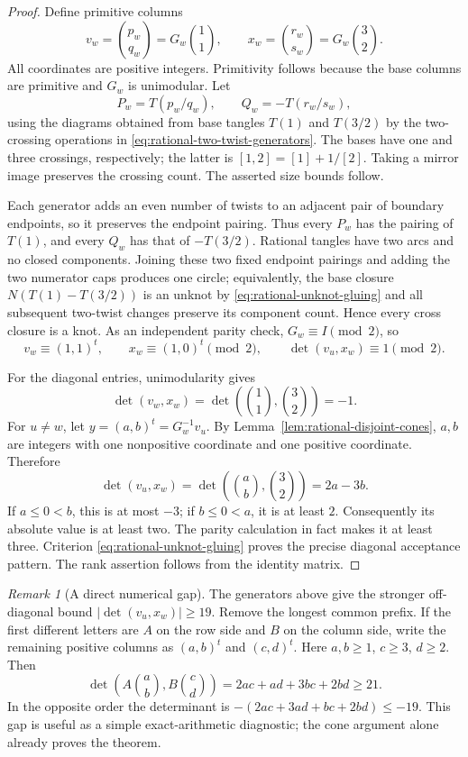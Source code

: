 \documentclass[11pt,a4paper]{article}
\theoremstyle{definition}
\theoremstyle{remark}
\newtheorem{remark}[theorem]{Remark}
\numberwithin{equation}{section}
\begin{document}
\begin{proof}
Define primitive columns
\[
 v_w=\binom{p_w}{q_w}=G_w\binom11,
 \qquad
 x_w=\binom{r_w}{s_w}=G_w\binom32.
\]
All coordinates are positive integers.  Primitivity follows because the
base columns are primitive and $G_w$ is unimodular.  Let
\[
 P_w=T(p_w/q_w),\qquad Q_w=-T(r_w/s_w),
\]
using the diagrams obtained from base tangles $T(1)$ and $T(3/2)$ by the
two-crossing operations in \eqref{eq:rational-two-twist-generators}.
The bases have one and three crossings, respectively; the latter is
$[1,2]=[1]+1/[2]$.  Taking a mirror image preserves the crossing count.
The asserted size bounds follow.

Each generator adds an even number of twists to an adjacent pair of
boundary endpoints, so it preserves the endpoint pairing.  Thus every
$P_w$ has the pairing of $T(1)$, and every $Q_w$ has that of $-T(3/2)$.
Rational tangles have two arcs and no closed components.  Joining these
two fixed endpoint pairings and adding the two numerator caps produces
one circle; equivalently, the base closure $N(T(1)-T(3/2))$ is an unknot
by \eqref{eq:rational-unknot-gluing} and all subsequent two-twist changes
preserve its component count.  Hence every cross closure is a knot.
As an independent parity check, $G_w\equiv I\pmod2$, so
\[
 v_w\equiv(1,1)^t,\qquad x_w\equiv(1,0)^t\pmod2,
 \qquad \det(v_u,x_w)\equiv1\pmod2.
\]

For the diagonal entries, unimodularity gives
\[
 \det(v_w,x_w)=\det\left(\binom11,\binom32\right)=-1.
\]
For $u\ne w$, let $y=(a,b)^t=G_w^{-1}v_u$.  By
Lemma~\ref{lem:rational-disjoint-cones}, $a,b$ are integers with one
nonpositive coordinate and one positive coordinate.  Therefore
\[
 \det(v_u,x_w)=\det\left(\binom ab,\binom32\right)=2a-3b.
\]
If $a\le0<b$, this is at most $-3$; if $b\le0<a$, it is at least $2$.
Consequently its absolute value is at least two.  The parity calculation
in fact makes it at least three.  Criterion
\eqref{eq:rational-unknot-gluing} proves the precise diagonal acceptance
pattern.  The rank assertion follows from the identity matrix.
\end{proof}

\begin{remark}[A direct numerical gap]
The generators above give the stronger off-diagonal bound
$|\det(v_u,x_w)|\ge19$.  Remove the longest common prefix.  If the first
different letters are $A$ on the row side and $B$ on the column side,
write the remaining positive columns as $(a,b)^t$ and $(c,d)^t$.
Here $a,b\ge1$, $c\ge3$, $d\ge2$.  Then
\[
 \det\left(A\binom ab,B\binom cd\right)
 =2ac+ad+3bc+2bd\ge21.
\]
In the opposite order the determinant is
$-(2ac+3ad+bc+2bd)\le-19$.
This gap is useful as a simple exact-arithmetic diagnostic; the cone
argument alone already proves the theorem.
\end{remark}
\end{document}
